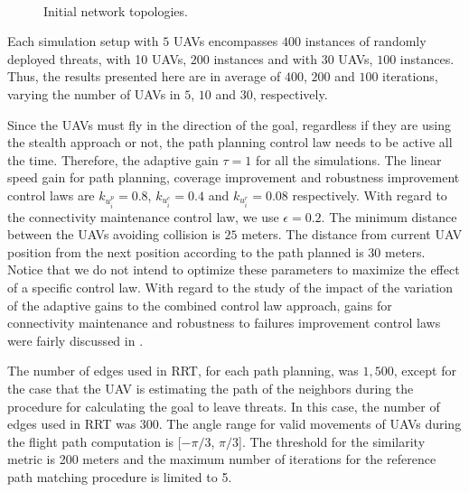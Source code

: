 \begin{figure}[hbt!]
      \centering            
       \\ \centering
      \caption{Initial network topologies.}
      \label{fig:startPositionUavs}
\end{figure}

Each simulation setup with $5$ UAVs encompasses $400$ instances of randomly deployed threats, with 10 UAVs, $200$ instances and with $30$ UAVs, $100$ instances. Thus, the results presented here are in average of $400$, $200$ and $100$ iterations, varying the number of UAVs in $5$, $10$ and $30$, respectively. 

Since the UAVs must fly in the direction of the goal, regardless if they are using the stealth approach or not, the path planning control law needs to be active all the time. Therefore, the adaptive gain $\tau=1$ for all the simulations. The linear speed gain for path planning, coverage improvement and robustness improvement control laws are $k_{u_i^p}=0.8$,  $k_{u_i^c}=0.4$ and $k_{u_i^r}=0.08$ respectively. With regard to the connectivity maintenance control law, we use $\epsilon=0.2$. The minimum distance between the UAVs avoiding collision is $25$ meters. The distance from current UAV position from the next position according to the path planned is $30$ meters. Notice that we do  not intend to optimize these parameters to maximize the effect of a specific control law. With regard to the study of the impact of the variation of the adaptive gains to the combined control law approach, gains for connectivity maintenance and robustness to failures improvement control laws were fairly discussed in \cite{ghedini_2016_dars, ghedini_2016}.

The number of edges used in RRT, for each path planning, was $1,500$, except for the case that the UAV is estimating the path of the neighbors during the procedure for calculating the goal to leave threats. In this case, the number of edges used in RRT was $300$. The angle range for valid movements of UAVs during the flight path computation is [$-\pi/3$, $\pi/3$]. The threshold for the similarity metric is 200 meters and the maximum number of iterations for the reference path matching procedure is limited to 5. 

